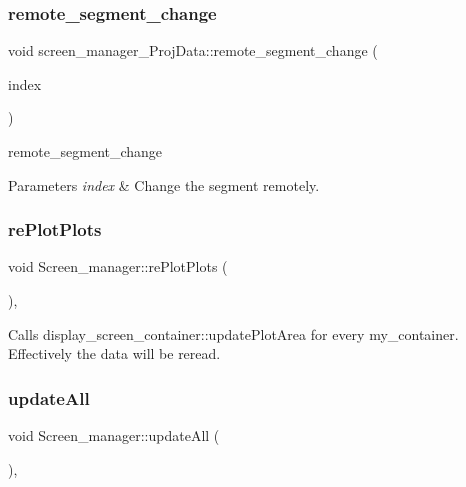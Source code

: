 \subsubsection{\texorpdfstring{remote\+\_\+segment\+\_\+change}{remote\_segment\_change}}
{\footnotesize\ttfamily void screen\+\_\+manager\+\_\+\+Proj\+Data\+::remote\+\_\+segment\+\_\+change (\begin{DoxyParamCaption}\item[{Q\+String}]{index }\end{DoxyParamCaption})\hspace{0.3cm}{\ttfamily [slot]}}



remote\+\_\+segment\+\_\+change 


\begin{DoxyParams}{Parameters}
{\em index} & Change the segment remotely. \\
\hline
\end{DoxyParams}
\mbox{\label{classScreen__manager_a0a17fba71b72fedefed5651b883ed371}} 
\subsubsection{\texorpdfstring{re\+Plot\+Plots}{rePlotPlots}}
{\footnotesize\ttfamily void Screen\+\_\+manager\+::re\+Plot\+Plots (\begin{DoxyParamCaption}{ }\end{DoxyParamCaption})\hspace{0.3cm}{\ttfamily [slot]}, {\ttfamily [inherited]}}

Calls display\+\_\+screen\+\_\+container\+::update\+Plot\+Area for every my\+\_\+container. Effectively the data will be reread. \mbox{\label{classScreen__manager_afc206ddd1fee12c08d890d7a0c4c5fcb}} 
\subsubsection{\texorpdfstring{update\+All}{updateAll}}
{\footnotesize\ttfamily void Screen\+\_\+manager\+::update\+All (\begin{DoxyParamCaption}{ }\end{DoxyParamCaption})\hspace{0.3cm}{\ttfamily [slot]}, {\ttfamily [inherited]}}

